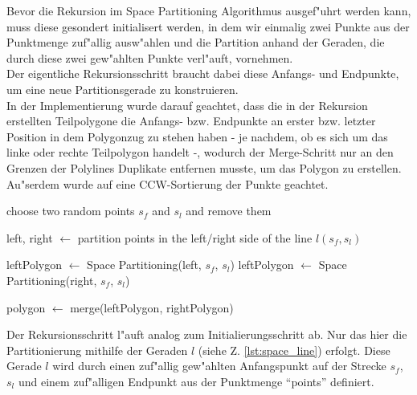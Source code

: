    \noindent
    Bevor die Rekursion im Space Partitioning Algorithmus ausgef"uhrt werden
    kann, muss diese gesondert initialisert werden, in dem wir einmalig zwei
    Punkte aus der Punktmenge zuf"allig ausw"ahlen und die Partition anhand der
    Geraden, die durch diese zwei gew"ahlten Punkte verl"auft, vornehmen. \\
    Der eigentliche Rekursionsschritt braucht dabei diese Anfangs- und
    Endpunkte, um eine neue Partitionsgerade zu konstruieren. \\
    In der Implementierung wurde darauf geachtet, dass die in der Rekursion
    erstellten Teilpolygone die Anfangs- bzw. Endpunkte an erster bzw. letzter
    Position in dem  Polygonzug zu stehen haben - je nachdem, ob es sich um das
    linke oder rechte Teilpolygon handelt -, wodurch der Merge-Schritt nur an
    den Grenzen der Polylines Duplikate entfernen musste, um das Polygon zu
    erstellen. Au"serdem wurde auf eine CCW-Sortierung der Punkte geachtet.



\begin{code}[caption={Space Partitioning}, mathescape=true]
choose two random points $s_f$ and $s_l$ and remove them

left, right $\leftarrow$ partition points in the left/right side of the line $l(s_f, s_l)$

leftPolygon $\leftarrow$ Space Partitioning(left, $s_f$, $s_l$)
leftPolygon $\leftarrow$ Space Partitioning(right, $s_f$, $s_l$)

polygon $\leftarrow$ merge(leftPolygon, rightPolygon)
\end{code}

    \noindent

    Der Rekursionsschritt l"auft analog zum Initialierungsschritt ab. Nur das
    hier die Partitionierung mithilfe der Geraden $l$ (siehe Z.
    \ref{lst:space_line}) erfolgt. Diese Gerade $l$ wird durch einen zuf"allig
    gew"ahlten Anfangspunkt auf der Strecke $s_f$, $s_l$ und einem zuf"alligen
    Endpunkt aus der Punktmenge ``points'' definiert.

